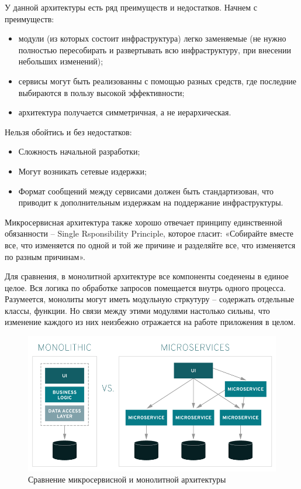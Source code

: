 У данной архитектуры есть ряд преимуществ и недостатков. Начнем с преимуществ:
\begin{itemize}
    \item модули (из которых состоит инфраструктура) легко заменяемые (не нужно
        полностью пересобирать и развертывать всю инфраструктуру, при внесении
        небольших изменений);
    \item сервисы могут быть реализованны с помощью разных средств, где
        последние выбираются в пользу высокой эффективности;
    \item архитектура получается симметричная, а не иерархическая.
\end{itemize}

Нельзя обойтись и без недостатков:
\begin{itemize}
    \item Сложность начальной разработки;
    \item Могут возникать сетевые издержки;
    \item Формат сообщений между сервисами должен быть стандартизован, что
        приводит к дополнительным издержкам на поддержание инфраструктуры.
\end{itemize}

Микросервисная архитектура также хорошо отвечает принципу единственной
обязанности -- Single Rsponsibility Principle, которое гласит: «Собирайте вместе
все, что изменяется по одной и той же причине и разделяйте все, что изменяется
по разным причинам».

Для сравнения, в монолитной архитектуре все компоненты соеденены в единое целое.
Вся логика по обработке запросов помещается внутрь одного процесса. Разумеется,
монолиты могут иметь модульную стркутуру -- содержать отдельные классы, функции.
Но связи между этими модулями настолько сильны, что изменение каждого из них
неизбежно отражается на работе приложения в целом.
\begin{figure}[H]
    \centering
    \includegraphics[scale=0.6]{inc/img/Monolithic-vs-microservices.png}
    \caption{Сравнение микросервисной и монолитной архитектуры}
\end{figure}

